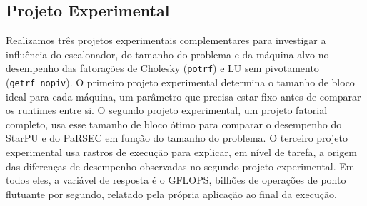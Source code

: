 \documentclass[12pt]{article}
\begin{document}
\subsection{Projeto Experimental}
\label{sec:org4bba544}

Realizamos três projetos experimentais complementares para investigar a
influência do escalonador, do tamanho do problema e da máquina alvo no
desempenho das fatorações de Cholesky (\texttt{potrf}) e LU sem pivotamento
(\texttt{getrf\_nopiv}). O primeiro projeto experimental determina o tamanho de bloco
ideal para cada máquina, um parâmetro que precisa estar fixo antes de comparar
os runtimes entre si. O segundo projeto experimental, um projeto fatorial
completo, usa esse tamanho de bloco ótimo para comparar o desempenho do StarPU e
do PaRSEC em função do tamanho do problema. O terceiro projeto experimental usa
rastros de execução para explicar, em nível de tarefa, a origem das diferenças
de desempenho observadas no segundo projeto experimental. Em todos eles, a
variável de resposta é o GFLOPS, bilhões de operações de ponto flutuante por
segundo, relatado pela própria aplicação ao final da execução.
\end{document}

